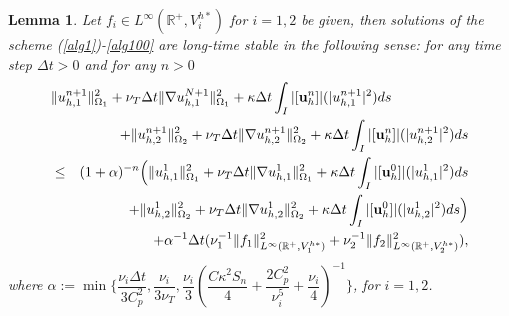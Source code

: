 \documentclass[10pt]{article}%
\numberwithin{equation}{section}
\newtheorem{lemma}{Lemma}[section]
\newcommand{\bu}{{\bf u}}
\begin{document}
\begin{lemma} \label{lll1}Let $f_i \in L^{\infty}(\mathbb{R}^+,V_i^{h*})$ for $i=1,2$ be given, then solutions of the scheme (\ref{alg1})-\eqref{alg100} are long-time stable in the following sense: for any time step $\Delta t >0$ and for any $n> 0$
		\begin{eqnarray}
	\lefteqn{\|{u^{n+1}_{h,1}}\|_{\Omega_1}^2 +\nu_T\Delta t\|\nabla  u_{h,1}^{N+1}\|^2_{\Omega_1}+{\kappa} \Delta t \int_{I}|[\bu_h^n]| (|u_{h,1}^{n+1}|^2)ds}\nonumber\\&&+\|{u^{n+1}_{h,2}}\|_{\Omega_2}^2 +\nu_T\Delta t\|\nabla  u_{h,2}^{n+1}\|^2_{\Omega_2} +{\kappa} \Delta t \int_{I}|[\bu_h^n]| (|u_{h,2}^{n+1}|^2)ds\nonumber\\
	&\leq&(1+\alpha)^{-n}\Big(\|{u^{1}_{h,1}}\|_{\Omega_1}^2+\nu_T\Delta t \|\nabla u_{h,1}^{1}\|_{\Omega_1}^2+\kappa \Delta t\int_{I}|[\bu_h^{0}]| (|u_{h,1}^{1}|^2)ds\nonumber\\
	&&+\|{u^{1}_{h,2}}\|_{\Omega_2}^2+\nu_T\Delta t \|\nabla u_{h,2}^{1}\|_{\Omega_2}^2+\kappa \Delta t\int_{I}|[\bu_h^{0}]| (|u_{h,2}^{1}|^2)ds\Big)\nonumber
	\\&& +\alpha^{-1}\Delta t(\nu_1^{-1}\|f_1\|_{L^{\infty}(\mathbb{R}^+,V_1^{h*})}^2+\nu_2^{-1}\|f_2\|_{L^{\infty}(\mathbb{R}^+,V_2^{h*})}^2),\label{lstb}
	\end{eqnarray}
	where $\alpha:=\min\Big\{\dfrac{\nu_i\Delta t}{3C_p^2},\dfrac{\nu_i}{3\nu_T},\dfrac{\nu_i}{3}(\dfrac{C\kappa^2S_n}{4}+\dfrac{2C_p^2}{\nu_i^5}+\dfrac{\nu_i}{4})^{-1}\Big\}$, for $i=1,2$.
\end{lemma}
\end{document}

